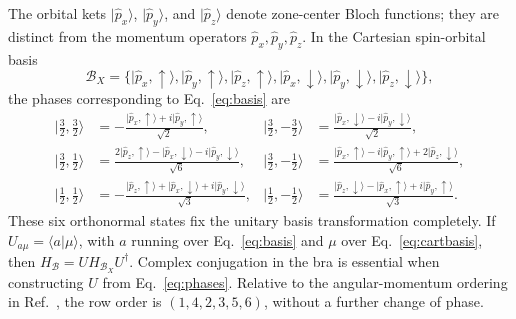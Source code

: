 \documentclass[10pt,letterpaper]{article}
\newcommand{\ket}[1]{\lvert #1\rangle}
\newcommand{\braket}[2]{\langle #1\vert #2\rangle}
\begin{document}
The orbital kets $\ket{ \hat{p}_ x}$, $\ket{ \hat{p}_ y}$, and $\ket{ \hat{p}_ z}$ denote zone-center Bloch functions; they are distinct from the momentum operators $ \hat{p}_ x, \hat{p}_ y, \hat{p}_ z$. In the Cartesian spin-orbital basis
\begin{equation}
\mathcal B_X=\{
\ket{ \hat{p}_ x,\uparrow},\ket{ \hat{p}_ y,\uparrow},\ket{ \hat{p}_ z,\uparrow},
\ket{ \hat{p}_ x,\downarrow},\ket{ \hat{p}_ y,\downarrow},\ket{ \hat{p}_ z,\downarrow}\},
\label{eq:cartbasis}
\end{equation}
the phases corresponding to Eq.~\eqref{eq:basis} are~\cite{delvecchio2026}
\begin{align}
\ket{\tfrac32,\tfrac32}
&=-\frac{\ket{ \hat{p}_ x,\uparrow}+i\ket{ \hat{p}_ y,\uparrow}}{\sqrt2},
&\ket{\tfrac32,-\tfrac32}
&=\frac{\ket{ \hat{p}_ x,\downarrow}-i\ket{ \hat{p}_ y,\downarrow}}{\sqrt2},
\nonumber\\[3pt]
\ket{\tfrac32,\tfrac12}
&=\frac{2\ket{ \hat{p}_ z,\uparrow}-\ket{ \hat{p}_ x,\downarrow}-i\ket{ \hat{p}_ y,\downarrow}}{\sqrt6},
&\ket{\tfrac32,-\tfrac12}
&=\frac{\ket{ \hat{p}_ x,\uparrow}-i\ket{ \hat{p}_ y,\uparrow}+2\ket{ \hat{p}_ z,\downarrow}}{\sqrt6},
\nonumber\\[3pt]
\ket{\tfrac12,\tfrac12}
&=-\frac{\ket{ \hat{p}_ z,\uparrow}+\ket{ \hat{p}_ x,\downarrow}+i\ket{ \hat{p}_ y,\downarrow}}{\sqrt3},
&\ket{\tfrac12,-\tfrac12}
&=\frac{\ket{ \hat{p}_ z,\downarrow}-\ket{ \hat{p}_ x,\uparrow}+i\ket{ \hat{p}_ y,\uparrow}}{\sqrt3}.
\label{eq:phases}
\end{align}
These six orthonormal states fix the unitary basis transformation completely. If $U_{a\mu}=\braket{a}{\mu}$, with $a$ running over Eq.~\eqref{eq:basis} and $\mu$ over Eq.~\eqref{eq:cartbasis}, then $H_{\mathcal B}=UH_{\mathcal B_X}U^\dagger$. Complex conjugation in the bra is essential when constructing $U$ from Eq.~\eqref{eq:phases}. Relative to the angular-momentum ordering in Ref.~\cite{delvecchio2026}, the row order is $(1,4,2,3,5,6)$, without a further change of phase.
\end{document}
